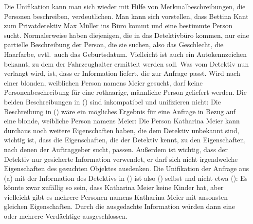 Die Unifikation kann man sich wieder mit Hilfe von Merkmalbeschreibungen, die Personen beschreiben, verdeutlichen.
Man kann sich vorstellen, dass Bettina Kant zum Privatdetektiv Max Müller ins Büro kommt und eine
bestimmte Person sucht. Normalerweise haben diejenigen, die in das Detektivbüro kommen, nur eine
partielle Beschreibung der Person, die sie suchen, also \zb das Geschlecht, die Haarfarbe, evtl.\
auch das Geburtsdatum. Vielleicht ist auch ein Autokennzeichen bekannt, zu dem der Fahrzeughalter
ermittelt werden soll.
Was vom Detektiv nun verlangt wird, ist, dass er Information liefert, die zur Anfrage passt. Wird
nach einer blonden, weiblichen Person namens Meier gesucht, darf keine Personenbeschreibung für eine rothaarige,
männliche Person geliefert werden. Die beiden Beschreibungen in (\mex{1}) sind inkompatibel und unifizieren nicht:
\eal
\ex {}
\ex {}
\zl
Die Beschreibung in () wäre ein mögliches Ergebnis für eine Anfrage in Bezug auf eine blonde, weibliche Person namens Meier:
\ea
{}
\z
Die Person Katharina Meier kann durchaus noch weitere Eigenschaften haben, die dem Detektiv unbekannt sind,
wichtig ist, dass die Eigenschaften, die der Detektiv kennt, zu den Eigenschaften, nach denen der Auftraggeber sucht,
passen. Außerdem ist wichtig, dass der Detektiv nur gesicherte Information verwendet, er darf sich nicht irgendwelche
Eigenschaften des gesuchten Objektes ausdenken. Die Unifikation der Anfrage aus (\mex{-1}a) mit der Information
des Detektivs in (\mex{0}) ist also (\mex{0}) selbst und nicht etwa (\mex{1}):
\ea
{}
\z
Es könnte zwar zufällig so sein, dass Katharina Meier keine Kinder hat, 
aber vielleicht gibt es mehrere Personen
namens Katharina Meier mit ansonsten gleichen Eigenschaften. 
Durch die ausgedachte Information würden dann eine oder mehrere Verdächtige ausgeschlossen.

